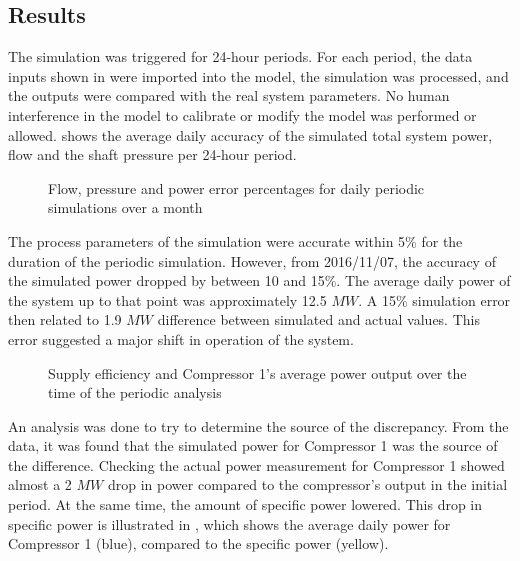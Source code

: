 \subsection{Results}

 The simulation was triggered for 24-hour periods. For each period, the data inputs shown in  were imported into the model, the simulation was processed, and the outputs were compared with the real system parameters. No human interference in the model to calibrate or modify the model was performed or allowed.  shows the average daily accuracy of the simulated total system power, flow and the shaft pressure per 24-hour period.
	 \par 
 
	\begin{figure}[h!]
		\centering
		
		\caption{Flow, pressure and power error percentages for daily periodic simulations over a month}
		\label{fig: Periodic simulation}
	\end{figure} 
The process parameters of the simulation were accurate within 5\% for the duration of the periodic simulation. However, from 2016/11/07, the accuracy of the simulated power dropped by between 10 and 15\%. The average daily power of the system up to that point was approximately 12.5 $MW$. A 15\% simulation error then related to 1.9 $MW$ difference between simulated and actual values. This error suggested a major shift in operation of the system.
\par 
\begin{figure}[h!]
	\centering
	
	\caption{Supply efficiency and Compressor 1's average power output over the time of the periodic analysis}
	\label{fig: MeasurementAccuracy.}
\end{figure} 

An analysis was done to try to determine the source of the discrepancy. From the data, it was found that the simulated power for Compressor 1 was the source of the difference. Checking the actual power measurement for Compressor 1 showed almost a 2 $MW$ drop in power compared to the compressor's output in the initial period. At the same time, the amount of specific power lowered. This drop in specific power is illustrated in , which shows the average daily power for Compressor 1 (blue), compared to the specific power (yellow). 
\par
	
